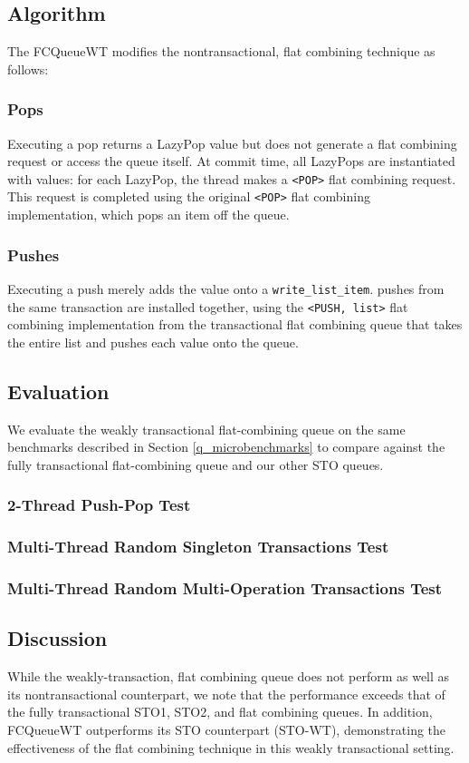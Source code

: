\subsection{Algorithm}

The FCQueueWT modifies the nontransactional, flat combining technique as follows:
   \subsubsection{Pops} 
    Executing a pop returns a LazyPop value but does not generate a flat combining request or access the queue itself. At commit time, all LazyPops are instantiated with values: for each LazyPop, the thread makes a \texttt{<POP>} flat combining request. This request is completed using the original \texttt{<POP>} flat combining implementation, which pops an item off the queue.

    \subsubsection{Pushes}
    Executing a push merely adds the value onto a \texttt{write\_list\_item}. pushes from the same transaction are installed together, using the \texttt{<PUSH, list>} flat combining implementation from the transactional flat combining queue that takes the entire list and pushes each value onto the queue.


\subsection{Evaluation}
%

We evaluate the weakly transactional flat-combining queue on the same benchmarks described in Section \ref{q_microbenchmarks} to compare against the fully transactional flat-combining queue and our other STO queues.

\subsubsection{2-Thread Push-Pop Test}

\subsubsection{Multi-Thread Random Singleton Transactions Test}

\subsubsection{Multi-Thread Random Multi-Operation Transactions Test}

\subsection{Discussion}
While the weakly-transaction, flat combining queue does not perform as well as its nontransactional counterpart, we note that the performance exceeds that of the fully transactional STO1, STO2, and flat combining queues. In addition, FCQueueWT outperforms its STO counterpart (STO-WT), demonstrating the effectiveness of the flat combining technique in this weakly transactional setting.
